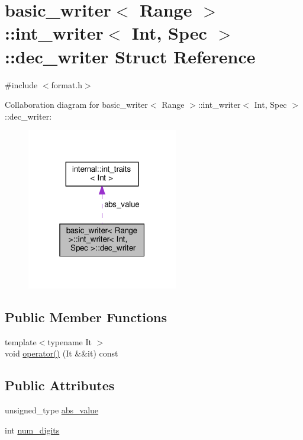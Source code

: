 \hypertarget{structbasic__writer_1_1int__writer_1_1dec__writer}{}\section{basic\+\_\+writer$<$ Range $>$\+:\+:int\+\_\+writer$<$ Int, Spec $>$\+:\+:dec\+\_\+writer Struct Reference}
\label{structbasic__writer_1_1int__writer_1_1dec__writer}


{\ttfamily \#include $<$format.\+h$>$}



Collaboration diagram for basic\+\_\+writer$<$ Range $>$\+:\+:int\+\_\+writer$<$ Int, Spec $>$\+:\+:dec\+\_\+writer\+:
\nopagebreak
\begin{figure}[H]
\begin{center}
\leavevmode
\includegraphics[width=187pt]{structbasic__writer_1_1int__writer_1_1dec__writer__coll__graph}
\end{center}
\end{figure}
\subsection*{Public Member Functions}
\begin{DoxyCompactItemize}
\item 
{\footnotesize template$<$typename It $>$ }\\void \hyperlink{structbasic__writer_1_1int__writer_1_1dec__writer_a92c5f546b25a1e4b51d5ddeacfd226e6}{operator()} (It \&\&it) const
\end{DoxyCompactItemize}
\subsection*{Public Attributes}
\begin{DoxyCompactItemize}
\item 
unsigned\+\_\+type \hyperlink{structbasic__writer_1_1int__writer_1_1dec__writer_a5a8561ead4637b0bae8e6a599aa5dae5}{abs\+\_\+value}
\item 
int \hyperlink{structbasic__writer_1_1int__writer_1_1dec__writer_aa8cab456f7b9cd4585cb0d681137ad13}{num\+\_\+digits}
\end{DoxyCompactItemize}


